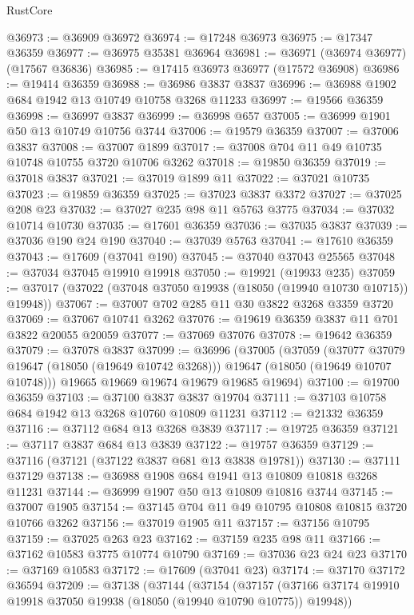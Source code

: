 \begin{lexlean}{RustCore}
\begin{coremodule}
@36973 := @36909 @36972
@36974 := @17248 @36973
@36975 := @17347 @36359
@36977 := @36975 @35381 @36964
@36981 := @36971 (@36974 @36977) (@17567 @36836)
@36985 := @17415 @36973 @36977 (@17572 @36908)
@36986 := @19414 @36359
@36988 := @36986 @3837 @3837
@36996 := @36988 @1902 @684 @1942 @13 @10749 @10758 @3268 @11233
@36997 := @19566 @36359
@36998 := @36997 @3837
@36999 := @36998 @657
@37005 := @36999 @1901 @50 @13 @10749 @10756 @3744
@37006 := @19579 @36359
@37007 := @37006 @3837
@37008 := @37007 @1899
@37017 := @37008 @704 @11 @49 @10735 @10748 @10755 @3720 @10706 @3262
@37018 := @19850 @36359
@37019 := @37018 @3837
@37021 := @37019 @1899 @11
@37022 := @37021 @10735
@37023 := @19859 @36359
@37025 := @37023 @3837 @3372
@37027 := @37025 @208 @23
@37032 := @37027 @235 @98 @11 @5763 @3775
@37034 := @37032 @10714 @10730
@37035 := @17601 @36359
@37036 := @37035 @3837
@37039 := @37036 @190 @24 @190
@37040 := @37039 @5763
@37041 := @17610 @36359
@37043 := @17609 (@37041 @190)
@37045 := @37040 @37043 @25565
@37048 := @37034 @37045 @19910 @19918
@37050 := @19921 (@19933 @235)
@37059 := @37017 (@37022 (@37048 @37050 @19938 (@18050 (@19940 @10730 @10715)) @19948))
@37067 := @37007 @702 @285 @11 @30 @3822 @3268 @3359 @3720
@37069 := @37067 @10741 @3262
@37076 := @19619 @36359 @3837 @11 @701 @3822 @20055 @20059
@37077 := @37069 @37076
@37078 := @19642 @36359
@37079 := @37078 @3837
@37099 := @36996
    (@37005
      (@37059
        (@37077 @37079 @19647 (@18050 (@19649 @10742 @3268)))
        @19647
        (@18050 (@19649 @10707 @10748)))
      @19665
      @19669
      @19674
      @19679
      @19685
      @19694)
@37100 := @19700 @36359
@37103 := @37100 @3837 @3837 @19704
@37111 := @37103 @10758 @684 @1942 @13 @3268 @10760 @10809 @11231
@37112 := @21332 @36359
@37116 := @37112 @684 @13 @3268 @3839
@37117 := @19725 @36359
@37121 := @37117 @3837 @684 @13 @3839
@37122 := @19757 @36359
@37129 := @37116 (@37121 (@37122 @3837 @681 @13 @3838 @19781))
@37130 := @37111 @37129
@37138 := @36988 @1908 @684 @1941 @13 @10809 @10818 @3268 @11231
@37144 := @36999 @1907 @50 @13 @10809 @10816 @3744
@37145 := @37007 @1905
@37154 := @37145 @704 @11 @49 @10795 @10808 @10815 @3720 @10766 @3262
@37156 := @37019 @1905 @11
@37157 := @37156 @10795
@37159 := @37025 @263 @23
@37162 := @37159 @235 @98 @11
@37166 := @37162 @10583 @3775 @10774 @10790
@37169 := @37036 @23 @24 @23
@37170 := @37169 @10583
@37172 := @17609 (@37041 @23)
@37174 := @37170 @37172 @36594
@37209 := @37138
    (@37144
      (@37154
        (@37157 (@37166 @37174 @19910 @19918 @37050 @19938 (@18050 (@19940 @10790 @10775)) @19948))

\end{coremodule}
\end{lexlean}
